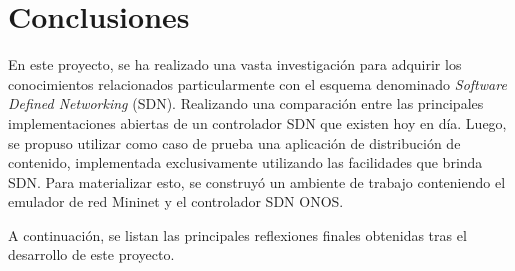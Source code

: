 
\chapter{Conclusiones} %

\label{Chapter7} %

En este proyecto, se ha realizado una vasta investigación para adquirir los conocimientos relacionados particularmente con el esquema denominado \textit{Software Defined Networking} (SDN). Realizando una comparación entre las principales implementaciones abiertas de un controlador SDN que existen hoy en día. Luego, se propuso utilizar como caso de prueba una aplicación de distribución de contenido, implementada exclusivamente utilizando las facilidades que brinda SDN. Para materializar esto, se construyó un ambiente de trabajo conteniendo el emulador de red Mininet y el controlador SDN ONOS.

A continuación, se listan las principales reflexiones finales obtenidas tras el desarrollo de este proyecto.

